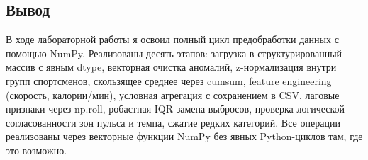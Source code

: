 \documentclass[oneside,a4paper,14pt]{extarticle}
\begin{document}
\begin{flushleft}
\newpage
\section*{Вывод}
\noindent
В ходе лабораторной работы я освоил полный цикл предобработки данных с помощью NumPy. Реализованы десять этапов: загрузка в структурированный массив с явным dtype, векторная очистка аномалий, z-нормализация внутри групп спортсменов, скользящее среднее через cumsum, feature engineering (скорость, калории/мин), условная агрегация с сохранением в CSV, лаговые признаки через np.roll, робастная IQR-замена выбросов, проверка логической согласованности зон пульса и темпа, сжатие редких категорий. Все операции реализованы через векторные функции NumPy без явных Python-циклов там, где это возможно.
\end{flushleft}
\end{document}
